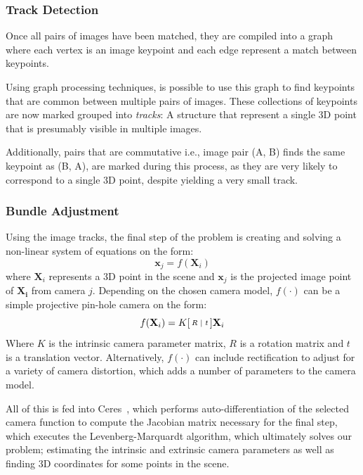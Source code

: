 \documentclass[preprint,acmtog]{acmart}
\begin{document}
\subsubsection{Track Detection}

Once all pairs of images have been matched, they are compiled into a graph where
each vertex is an image keypoint and each edge represent a match between
keypoints.


Using graph processing techniques, is possible to use this graph to find
keypoints that are common between multiple pairs of images. These collections of
keypoints are now marked grouped into \emph{tracks}: A structure that represent
a single 3D point that is presumably visible in multiple images.

Additionally, pairs that are commutative i.e., image pair (A, B) finds the same
keypoint as (B, A), are marked during this process, as they are very likely to
correspond to a single 3D point, despite yielding a very small track.


\subsubsection{Bundle Adjustment}

Using the image tracks, the final step of the problem is creating and solving a
non-linear system of equations on the form:
%
\begin{equation*}
  \mathbf{x}_{j} = f(\mathbf{X}_{i})
\end{equation*}
%
where $\mathbf{X}_{i}$ represents a 3D point in the scene and $\mathbf{x}_{j}$
is the projected image point of $\mathbf{X_{i}}$ from camera $j$. Depending on
the chosen camera model, $f(\cdot)$ can be a simple projective pin-hole camera on
the form:
%
\begin{equation*}
  f(\mathbf{X}_{i}) =
  K \begin{bsmallmatrix}R & | & t\end{bsmallmatrix} \mathbf{X}_{i}
\end{equation*}
%
Where $K$ is the intrinsic camera parameter matrix, $R$ is a rotation matrix and
$t$ is a translation vector. Alternatively, $f(\cdot)$ can include rectification to
adjust for a variety of camera distortion, which adds a number of parameters to
the camera model.

All of this is fed into Ceres~\cite{ceres-solver}, which performs
auto-differentiation of the selected camera function to compute the Jacobian
matrix necessary for the final step, which executes the Levenberg-Marquardt
algorithm\cite{More78}, which ultimately solves our problem; estimating the
intrinsic and extrinsic camera parameters as well as finding 3D coordinates for
some points in the scene.
\end{document}
